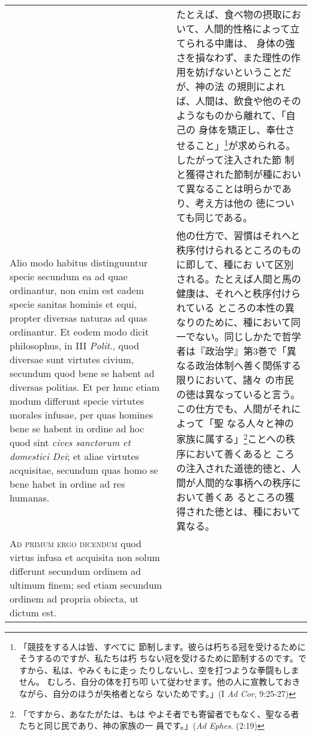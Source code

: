 \documentclass[10pt]{jsarticle}
\begin{document}
\begin{longtable}{p{21em}p{21em}}
&

 たとえば、食べ物の摂取において、人間的性格によって立てられる中庸は、
 身体の強さを損なわず、また理性の作用を妨げないということだが、神の法
 の規則によれば、人間は、飲食や他のそのようなものから離れて、「自己の
 身体を矯正し、奉仕させること」\footnote{「競技をする人は皆、すべてに
 節制します。彼らは朽ちる冠を受けるためにそうするのですが、私たちは朽
 ちない冠を受けるために節制するのです。ですから、私は、やみくもに走っ
 たりしないし、空を打つような拳闘もしません。 むしろ、自分の体を打ち叩
 いて従わせます。他の人に宣教しておきながら、自分のほうが失格者となら
 ないためです。」(I {\itshape Ad Cor}, 9:25-27)}が求められる。したがって注入された節
 制と獲得された節制が種において異なることは明らかであり、考え方は他の
 徳についても同じである。
 
\\


Alio modo habitus distinguuntur specie secundum ea ad quae ordinantur,
non enim est eadem specie sanitas hominis et equi, propter diversas
naturas ad quas ordinantur. Et eodem modo dicit philosophus, in III
{\itshape Polit}., quod diversae sunt virtutes civium, secundum quod
bene se habent ad diversas politias. Et per hunc etiam modum differunt
specie virtutes morales infusae, per quas homines bene se habent in
ordine ad hoc quod sint {\itshape cives sanctorum et domestici Dei};
et aliae virtutes acquisitae, secundum quas homo se bene habet in
ordine ad res humanas.


&

 他の仕方で、習慣はそれへと秩序付けられるところのものに即して、種にお
 いて区別される。たとえば人間と馬の健康は、それへと秩序付けられている
 ところの本性の異なりのために、種において同一でない。同じしかたで哲学
 者は『政治学』第3巻で「異なる政治体制へ善く関係する限りにおいて、諸々
 の市民の徳は異なっていると言う。この仕方でも、人間がそれによって「聖
 なる人々と神の家族に属する」\footnote{「ですから、あなたがたは、もは
 やよそ者でも寄留者でもなく、聖なる者たちと同じ民であり、神の家族の一
 員です。」({\itshape Ad Ephes}. (2:19)}ことへの秩序において善くあると
 ころの注入された道徳的徳と、人間が人間的な事柄への秩序において善くあ
 るところの獲得された徳とは、種において異なる。
 
\\

{\scshape Ad primum ergo dicendum} quod virtus infusa et acquisita non
solum differunt secundum ordinem ad ultimum finem; sed etiam secundum
ordinem ad propria obiecta, ut dictum est.



\end{longtable}
\end{document}
